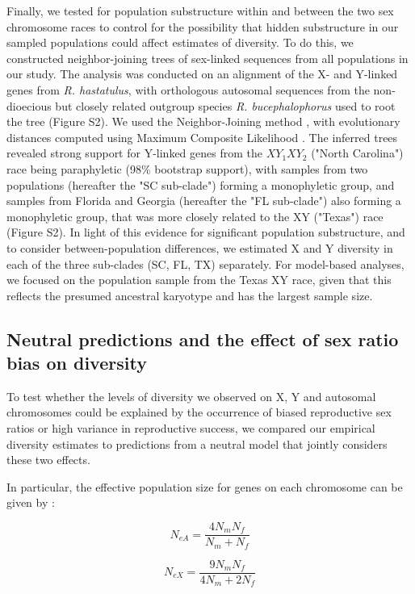 \documentclass[9pt,twocolumn,twoside]{gsajnl}
\begin{document}
Finally, we tested for population substructure within and between the two sex chromosome races to control for the possibility that hidden substructure in our sampled populations could affect estimates of diversity. To do this, we constructed neighbor-joining trees of sex-linked sequences from all populations in our study. The analysis was conducted on an alignment of the X- and Y-linked genes from \textit{R. hastatulus}, with orthologous autosomal sequences from the non-dioecious but closely related outgroup species \textit{R. bucephalophorus} used to root the tree (Figure S2). We used the Neighbor-Joining method \citep{saitou1987neighbor}, with evolutionary distances computed using Maximum Composite Likelihood \citep{tamura2011mega5}. The inferred trees revealed strong support for Y-linked genes from the $XY_{1}XY_{2}$ ("North Carolina") race being paraphyletic (98\% bootstrap support), with samples from two populations (hereafter the "SC sub-clade") forming a monophyletic group, and samples from Florida and Georgia (hereafter the "FL sub-clade") also forming a monophyletic group, that was more closely related to the XY ("Texas") race (Figure S2). In light of this evidence for significant population substructure, and to consider between-population differences, we estimated X and Y diversity in each of the three sub-clades (SC, FL, TX) separately. For model-based analyses, we focused on the population sample from the Texas XY race, given that this reflects the presumed ancestral karyotype and has the largest sample size. 

\subsection*{Neutral predictions and the effect of sex ratio bias on diversity}
To test whether the levels of diversity we observed on X, Y and autosomal chromosomes could be explained by the occurrence of biased reproductive sex ratios or high variance in reproductive success, we compared our empirical diversity estimates to predictions from a neutral model that jointly considers these two effects. 


In particular, the effective population size for genes on each chromosome can be given by  \citep{wright1931evolution}:

\begin{equation}
N_{e{A}} = \frac{4N_{m}N_{f}}{N_{m}+N_{f}}\label{eq:NeA}
\end{equation}


\begin{equation}
N_{e{X}} = \frac{9N_{m}N_{f}}{4N_{m}+2N_{f}}\label{eq:NeX}
\end{equation}
\end{document}
